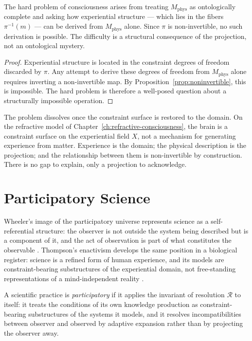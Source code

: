 \documentclass[11pt,openany]{book}
\begin{document}
\begin{proposition}
\label{prop:hard-problem}
The hard problem of consciousness arises from treating
$M_{\mathrm{phys}}$ as ontologically complete and asking
how experiential structure --- which lies in the fibers
$\pi^{-1}(m)$ --- can be derived from $M_{\mathrm{phys}}$
alone.  Since $\pi$ is non-invertible, no such derivation
is possible.  The difficulty is a structural consequence
of the projection, not an ontological mystery.
\end{proposition}

\begin{proof}
Experiential structure is located in the constraint degrees
of freedom discarded by $\pi$.  Any attempt to derive these
degrees of freedom from $M_{\mathrm{phys}}$ alone requires
inverting a non-invertible map.  By
Proposition~\ref{prop:noninvertible}, this is impossible.
The hard problem is therefore a well-posed question about a
structurally impossible operation.
\end{proof}

The problem dissolves once the constraint surface is
restored to the domain.  On the refractive model of
Chapter~\ref{ch:refractive-consciousness}, the brain is a
constraint surface on the experiential field $X$, not a
mechanism for generating experience from matter.  Experience
is the domain; the physical description is the projection;
and the relationship between them is non-invertible by
construction.  There is no gap to explain, only a
projection to acknowledge.

\section{Participatory Science}
\label{sec:participatory}

Wheeler's image of the participatory universe represents
science as a self-referential structure: the observer is
not outside the system being described but is a component
of it, and the act of observation is part of what
constitutes the observable \citep{thompson2023blindspot}.
Thompson's enactivism develops the same position in a
biological register: science is a refined form of human
experience, and its models are constraint-bearing
substructures of the experiential domain, not free-standing
representations of a mind-independent reality
\citep{varela1991embodied}.

\begin{definition}
\label{def:participatory-science}
A scientific practice is \emph{participatory} if it applies
the invariant of resolution $\mathcal{R}$ to itself: it
treats the conditions of its own knowledge production as
constraint-bearing substructures of the systems it models,
and it resolves incompatibilities between observer and
observed by adaptive expansion rather than by projecting
the observer away.
\end{definition}
\end{document}
